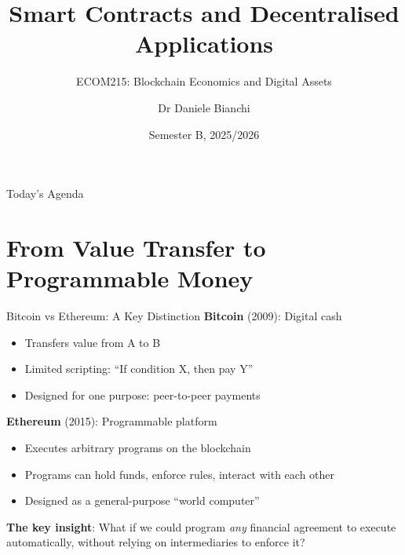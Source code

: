 \documentclass[10pt]{beamer}
\title{Smart Contracts and Decentralised Applications}
\subtitle{ECOM215: Blockchain Economics and Digital Assets}
\author{Dr Daniele Bianchi}
\institute{Queen Mary, University of London}
\date{Semester B, 2025/2026}
\begin{document}
\AtBeginSection[]{
  \begin{frame}[plain]
    \vfill
    \begin{center}
      {\Large\color{ImperialBlue}\insertsection}
    \end{center}
    \vfill
  \end{frame}
}

\begin{frame}[plain]
  \titlepage
\end{frame}

\begin{frame}{Today's Agenda}
  \tableofcontents
\end{frame}

\section{From Value Transfer to Programmable Money}

\begin{frame}{Bitcoin vs Ethereum: A Key Distinction}
  \textbf{Bitcoin} (2009): Digital cash
  \begin{itemize}
    \item Transfers value from A to B
    \item Limited scripting: ``If condition X, then pay Y''
    \item Designed for one purpose: peer-to-peer payments
  \end{itemize}
  
  \vspace{1em}
  \textbf{Ethereum} (2015): Programmable platform
  \begin{itemize}
    \item Executes arbitrary programs on the blockchain
    \item Programs can hold funds, enforce rules, interact with each other
    \item Designed as a general-purpose ``world computer''
  \end{itemize}
  
  \vspace{1em}
  \textbf{The key insight}: What if we could program \textit{any} financial agreement to execute automatically, without relying on intermediaries to enforce it?
\end{frame}
\end{document}
